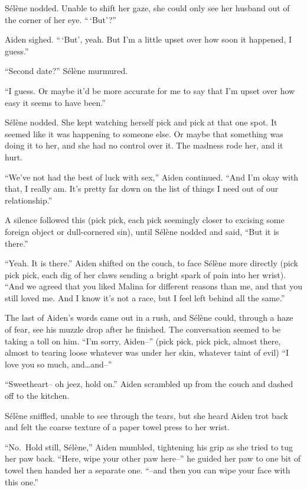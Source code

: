 Sélène nodded. Unable to shift her gaze, she could only see her husband out of the corner of her eye. ``\,`But'?''

Aiden sighed. ``\,`But', yeah. But I'm a little upset over how soon it happened, I guess.''

``Second date?'' Sélène murmured.

``I guess. Or maybe it'd be more accurate for me to say that I'm upset over how easy it seems to have been.''

Sélène nodded. She kept watching herself pick and pick at that one spot. It seemed like it was happening to someone else. Or maybe that something was doing it to her, and she had no control over it. The madness rode her, and it hurt.

``We've not had the best of luck with sex,'' Aiden continued. ``And I'm okay with that, I really am. It's pretty far down on the list of things I need out of our relationship.''

A silence followed this (pick pick, each pick seemingly closer to excising some foreign object or dull-cornered sin), until Sélène nodded and said, ``But it is there.''

``Yeah. It is there.'' Aiden shifted on the couch, to face Sélène more directly (pick pick pick, each dig of her claws sending a bright spark of pain into her wrist). ``And we agreed that you liked Malina for different reasons than me, and that you still loved me. And I know it's not a race, but I feel left behind all the same.''

The last of Aiden's words came out in a rush, and Sélène could, through a haze of fear, see his muzzle drop after he finished. The conversation seemed to be taking a toll on him. ``I'm sorry, Aiden--'' (pick pick, pick pick, almost there, almost to tearing loose whatever was under her skin, whatever taint of evil) ``I love you so much, and\ldots{}and--''

``Sweetheart-- oh jeez, hold on.'' Aiden scrambled up from the couch and dashed off to the kitchen.

Sélène sniffled, unable to see through the tears, but she heard Aiden trot back and felt the coarse texture of a paper towel press to her wrist.

``No.~Hold still, Sélène,'' Aiden mumbled, tightening his grip as she tried to tug her paw back. ``Here, wipe your other paw here--'' he guided her paw to one bit of towel then handed her a separate one. ``--and then you can wipe your face with this one.''

